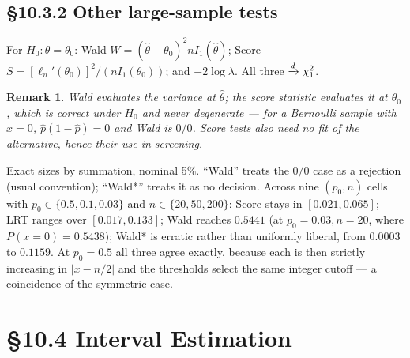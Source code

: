 \documentclass[11pt]{article}
\newtheorem{remark}[theorem]{Remark}
\begin{document}
\subsection{\S10.3.2 Other large-sample tests}
For $H_0:\theta=\theta_0$: Wald $W=(\hat\theta-\theta_0)^2nI_1(\hat\theta)$; Score $S=[\ell_n'(\theta_0)]^2/(nI_1(\theta_0))$; and $-2\log\lambda$. All three $\xrightarrow{d}\chi^2_1$.
\begin{remark}
Wald evaluates the variance at $\hat\theta$; the score statistic evaluates it at $\theta_0$, which is correct under $H_0$ and never degenerate --- for a Bernoulli sample with $x=0$, $\hat p(1-\hat p)=0$ and Wald is $0/0$. Score tests also need no fit of the alternative, hence their use in screening.
\end{remark}
\begin{simbox}
Exact sizes by summation, nominal 5\%. ``Wald'' treats the $0/0$ case as a rejection (usual convention); ``Wald*'' treats it as no decision. Across nine $(p_0,n)$ cells with $p_0\in\{0.5,0.1,0.03\}$ and $n\in\{20,50,200\}$: Score stays in $[0.021,0.065]$; LRT ranges over $[0.017,0.133]$; Wald reaches $0.5441$ (at $p_0=0.03,n=20$, where $P(x=0)=0.5438$); Wald* is erratic rather than uniformly liberal, from $0.0003$ to $0.1159$. At $p_0=0.5$ all three agree exactly, because each is then strictly increasing in $|x-n/2|$ and the thresholds select the same integer cutoff --- a coincidence of the symmetric case.
\end{simbox}

\section{\S10.4 Interval Estimation}
\end{document}
